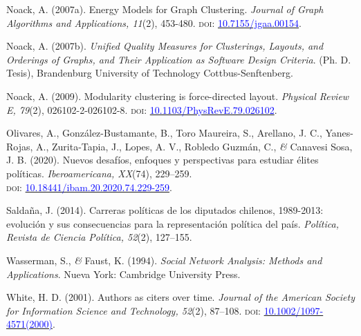 \documentclass[a4paper]{tufte-handout}
\begin{document}
{\begin{list}{}
\item{\small Noack, A. (2007a). Energy Models for Graph Clustering. {\itshape Journal of Graph Algorithms and Applications, 11}(2), 453-480. {\scshape doi:} \href{http://dx.doi.org/10.7155/jgaa.00154}{\textcolor{blue}{10.7155/jgaa.00154}}.}

\item{\small Noack, A. (2007b). {\itshape Unified Quality Measures for Clusterings, Layouts, and Orderings of Graphs, and Their Application as Software Design Criteria}. (Ph. D. Tesis), Brandenburg University of Technology Cottbus-Senftenberg.}

\item{\small Noack, A. (2009). Modularity clustering is force-directed layout. {\itshape Physical Review E, 79}(2), 026102-2-026102-8. {\scshape doi:} \href{https://doi.org/10.1103/PhysRevE.79.026102}{\textcolor{blue}{10.1103/PhysRevE.79.026102}}.}

\item{\small Olivares, A., González-Bustamante, B., Toro Maureira, S., Arellano, J. C., Yanes-Rojas, A., Zurita-Tapia, J., Lopes, A. V., Robledo Guzmán, C., {\itshape \&} Canavesi Sosa, J. B. (2020). Nuevos desafíos, enfoques y perspectivas para estudiar élites políticas. {\itshape Iberoamericana, XX}(74), 229--259. \\ {\scshape doi:} \href{http://doi.org/10.18441/ibam.20.2020.74.229-259}{\textcolor{blue}{10.18441/ibam.20.2020.74.229-259}}.}

\item{\small Saldaña, J. (2014). Carreras políticas de los diputados chilenos, 1989-2013: evolución y sus consecuencias para la representación política del país. {\itshape Política, Revista de Ciencia Política, 52}(2), 127--155.}

\item{\small Wasserman, S., {\itshape \&} Faust, K. (1994). {\itshape Social Network Analysis: Methods and Applications}. Nueva York: Cambridge University Press.}

\item{\small White, H. D. (2001). Authors as citers over time. {\itshape Journal of the American Society for Information Science and Technology, 52}(2), 87--108. {\scshape doi}: \href{https://doi.org/10.1002/1097-4571(2000)9999:9999\%3C::AID-ASI1542\%3E3.0.CO;2-T}{\textcolor{blue}{10.1002/1097-4571(2000)}}.}
\end{list}


}
\end{document}
